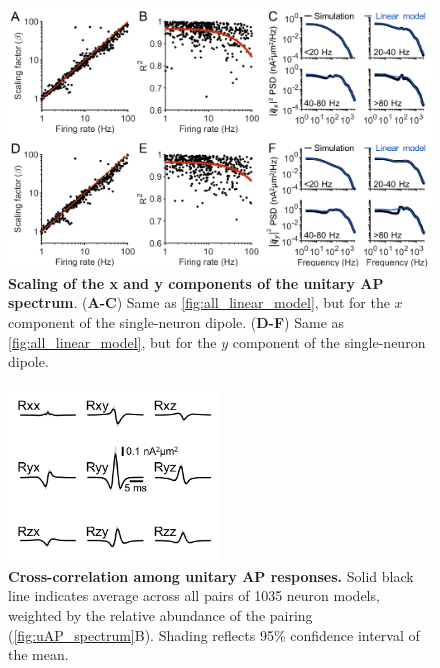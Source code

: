 \begin{figure}[h!]
    \centering
    \includegraphics[width=14cm]{Figures/chapter3/figureS1.png}
    \caption{\textbf{Scaling of the x and y components of the unitary AP spectrum}. (\textbf{A-C}) Same as {\autoref{fig:all_linear_model}}, but for the $x$ component of the single-neuron dipole. (\textbf{D-F}) Same as {\autoref{fig:all_linear_model}}, but for the $y$ component of the single-neuron dipole.} 
    \label{fig:linear_model_xy}
\end{figure}

\clearpage

\begin{figure}[h!]
    \centering
    \includegraphics[width=5.6cm]{Figures/chapter3/figureS2.png}
    \caption{\textbf{Cross-correlation among unitary AP responses.} Solid black line indicates average across all pairs of 1035 neuron models, weighted by the relative abundance of the pairing ({\autoref{fig:uAP_spectrum}B}). Shading reflects 95\% confidence interval of the mean.} 
    \label{fig:cross_ap_correlation}
\end{figure}

\clearpage

